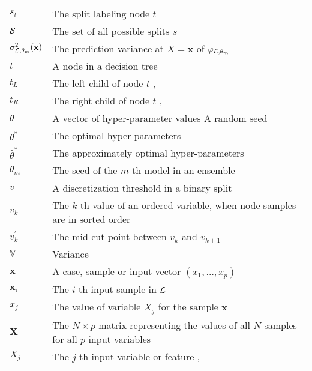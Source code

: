 \begin{tabularx}{\textwidth}{ l X }
$s_t$ & The split labeling node $t$ \dotfill  \pageref{ntn:s_t}\\
${\cal S}$ & The set of all possible splits $s$ \dotfill  \pageref{ntn:S-all}\\
$\sigma^2_{{\cal L},\theta_m}(\mathbf{x})$ & The prediction variance at $X = \mathbf{x}$ of $\varphi_{{\cal L},\theta_m}$ \dotfill \pageref{eqn:4:sigma} \\
$t$ & A node in a decision tree \dotfill  \pageref{ntn:node}\\
$t_L$ & The left child of node $t$ \dotfill \pageref{ntn:t_L}, \pageref{ntn:t_L2}\\
$t_R$ & The right child of node $t$ \dotfill \pageref{ntn:t_R}, \pageref{ntn:t_R2}\\
$\theta$ & A vector of hyper-parameter values \dotfill  \pageref{ntn:theta}\newline A random seed \dotfill \pageref{ntn:theta-seed}\\
$\theta^*$ & The optimal hyper-parameters \dotfill  \pageref{ntn:theta-star}\\
$\widehat{\theta}^*$ & The approximately optimal hyper-parameters \dotfill  \pageref{ntn:theta-star-approx}\\
$\theta_m$ & The seed of the $m$-th model in an ensemble \dotfill  \pageref{ntn:theta-seed-m}\\
$v$ & A discretization threshold in a binary split \dotfill  \pageref{ntn:v}\\
$v_k$ & The $k$-th value of an ordered variable, when node samples are in sorted order \dotfill  \pageref{ntn:v_k}\\
$v_k^\prime$ & The mid-cut point between $v_k$ and $v_{k+1}$ \dotfill  \pageref{ntn:v_k_prime}\\
$\mathbb{V}$ & Variance \dotfill \\
$\textbf{x}$ & A case, sample or input vector $(x_1, \dots, x_p)$ \dotfill  \pageref{ntn:sample-x}\\
$\textbf{x}_i$ & The $i$-th input sample in ${\cal L}$ \dotfill  \pageref{ntn:sample-x_i}\\
$x_j$ & The value of variable $X_j$ for the sample $\textbf{x}$ \dotfill  \pageref{ntn:value-x_j}\\
$\textbf{X}$ & The $N\times p$ matrix representing the values of all $N$ samples for all $p$ input variables \dotfill  \pageref{ntn:matrix-X}\\
$X_j$ & The $j$-th input variable or feature \dotfill  \pageref{ntn:var-X_j}, \pageref{ntn:var-X_j2}\\

\end{tabularx}
